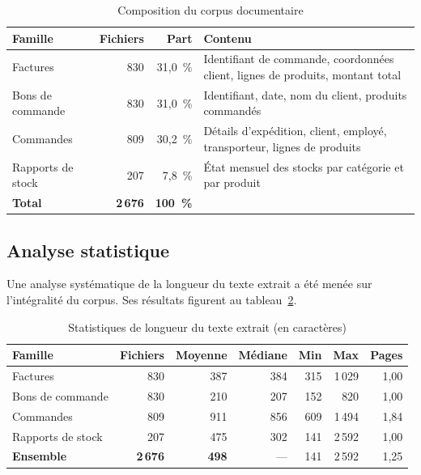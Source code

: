 \begin{table}[htbp]
\centering
\caption{Composition du corpus documentaire}
\label{tab:corpus}
\small
\begin{tabularx}{\textwidth}{@{}p{3.5cm}rrX@{}}
\toprule
\textbf{Famille} & \textbf{Fichiers} & \textbf{Part} & \textbf{Contenu} \\
\midrule
Factures & 830 & 31,0~\% &
Identifiant de commande, coordonnées client, lignes de produits, montant total \\
Bons de commande & 830 & 31,0~\% &
Identifiant, date, nom du client, produits commandés \\
Commandes & 809 & 30,2~\% &
Détails d'expédition, client, employé, transporteur, lignes de produits \\
Rapports de stock & 207 & 7,8~\% &
État mensuel des stocks par catégorie et par produit \\
\midrule
\textbf{Total} & \textbf{2\,676} & \textbf{100~\%} & \\
\bottomrule
\end{tabularx}
\end{table}

\subsection{Analyse statistique}

Une analyse systématique de la longueur du texte extrait a été menée sur
l'intégralité du corpus. Ses résultats figurent au tableau~\ref{tab:stats}.

\begin{table}[htbp]
\centering
\caption{Statistiques de longueur du texte extrait (en caractères)}
\label{tab:stats}
\small
\begin{tabular}{@{}lrrrrrr@{}}
\toprule
\textbf{Famille} & \textbf{Fichiers} & \textbf{Moyenne} & \textbf{Médiane} &
\textbf{Min} & \textbf{Max} & \textbf{Pages} \\
\midrule
Factures            & 830 & 387 & 384 & 315 & 1\,029 & 1,00 \\
Bons de commande    & 830 & 210 & 207 & 152 & 820    & 1,00 \\
Commandes           & 809 & 911 & 856 & 609 & 1\,494 & 1,84 \\
Rapports de stock   & 207 & 475 & 302 & 141 & 2\,592 & 1,00 \\
\midrule
\textbf{Ensemble}   & \textbf{2\,676} & \textbf{498} & --- & 141 & 2\,592 & 1,25 \\
\bottomrule
\end{tabular}
\end{table}

